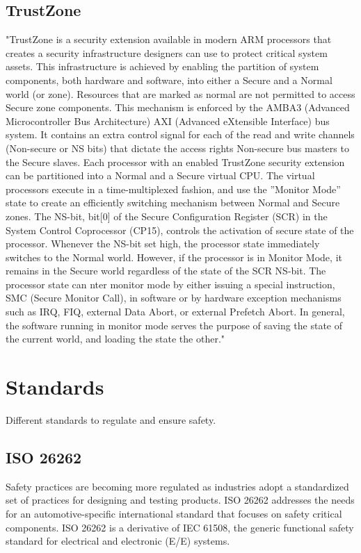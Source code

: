 \subsection{TrustZone}
\label{sec:trustzone}
"TrustZone is a security extension available in modern ARM processors that creates a security infrastructure designers can use to protect critical system assets. This infrastructure is achieved by enabling the partition of system components, both hardware and software, into either a Secure and a Normal world (or zone). Resources that are marked as normal are not permitted to access Secure zone components. This mechanism is enforced by the AMBA3 (Advanced Microcontroller Bus Architecture) AXI (Advanced eXtensible Interface) bus system. It contains an extra control signal for each of the read and write channels (Non-secure or NS bits) that dictate the access rights Non-secure bus masters to the Secure slaves. Each processor with an enabled TrustZone security extension can be partitioned into a Normal and a Secure virtual CPU. The virtual processors execute in a time-multiplexed fashion, and use the ”Monitor Mode” state to create an efficiently switching mechanism between Normal and Secure zones. The NS-bit, bit[0] of the Secure Configuration Register (SCR) in the System Control Coprocessor (CP15), controls the activation of secure state of the processor. Whenever the NS-bit set high, the processor state immediately switches to the Normal world. However, if the processor is in Monitor Mode, it remains in the Secure world regardless of the state of the SCR NS-bit. The processor state can nter monitor mode by either issuing a special instruction, SMC (Secure Monitor Call), in software or by hardware exception mechanisms such as IRQ, FIQ, external Data Abort, or external Prefetch Abort. In general, the software running in monitor mode serves the purpose of saving the state of the current world, and loading the state the other."~\cite{website:ARM} \\ %

\section{Standards}
Different standards to regulate and ensure safety.

\subsection{ISO 26262}
Safety practices are becoming more regulated as industries adopt a standardized set of practices for designing and testing products. ISO 26262 addresses the needs for an automotive-specific international standard that focuses on safety critical components. ISO 26262 is a derivative of IEC 61508, the generic functional safety standard for electrical and electronic (E/E) systems.

